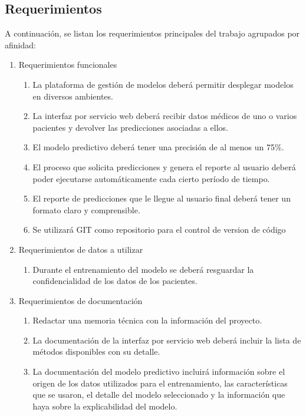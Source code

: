 \subsection{Requerimientos}
A continuación, se listan los requerimientos principales del trabajo agrupados por afinidad:
\begin{enumerate}
	\item Requerimientos funcionales
		\begin{enumerate}
			\item La plataforma de gestión de modelos deberá permitir desplegar modelos en diversos ambientes.
			\item La interfaz por servicio web deberá recibir datos médicos de uno o varios pacientes y devolver las predicciones asociadas a ellos.			
			\item El modelo predictivo deberá tener una precisión de al menos un 75\%.
			\item El proceso que solicita predicciones y genera el reporte al usuario deberá poder ejecutarse automáticamente cada cierto período de tiempo.		
			\item El reporte de predicciones que le llegue al usuario final deberá tener un formato claro y comprensible.
			\item Se utilizará GIT como repositorio para el control de version de código
		\end{enumerate}
	\item Requerimientos de datos a utilizar
		\begin{enumerate}		
		\item Durante el entrenamiento del modelo se deberá resguardar la confidencialidad de los datos de los pacientes.		
		\end{enumerate}
	\item Requerimientos de documentación
		\begin{enumerate}
			\item Redactar una memoria técnica con la información del proyecto.
			\item La documentación de la interfaz por servicio web deberá incluir la lista de métodos disponibles con su detalle.
			\item La documentación del modelo predictivo incluirá información sobre el origen de los datos utilizados para el entrenamiento, las características que se usaron, el detalle del modelo seleccionado y la información que haya sobre la explicabilidad del modelo.
		\end{enumerate}		
\end{enumerate}

